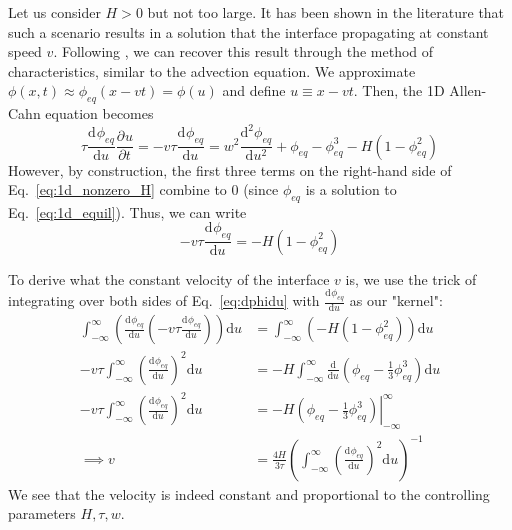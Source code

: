 \documentclass[12pt]{article}
\newcommand{\refeq}[1]{Eq.~\eqref{#1}}
\newcommand{\diff}{\mathrm{d}}
\providecommand*{\deriv}[3][]{\frac{\diff^{#1}#2}{\diff #3^{#1}}}
\providecommand*{\pderiv}[3][]{\frac{\partial^{#1}#2}{\partial #3^{#1}}}
\begin{document}
Let us consider $H>0$ but not too large. 
It has been shown in the literature that such a scenario results in a solution that the interface propagating at constant speed $v$.
Following \cite{provatas2011phase}, we can recover this result through the method of characteristics, similar to the advection equation.
We approximate $\phi(x,t) \approx \phi_{eq}(x-vt) = \phi(u)$ and define $u\equiv x-vt$.
Then, the 1D Allen-Cahn equation becomes
\begin{equation}
    \tau \deriv{\phi_{eq}}{u} \pderiv{u}{t} = -v \tau \deriv{\phi_{eq}}{u} = w^2 \deriv[2]{\phi_{eq}}{u} + \phi_{eq} - \phi_{eq}^3 -H\left(1 - \phi_{eq}^2\right) \label{eq:1d_nonzero_H}
\end{equation}
However, by construction, the first three terms on the right-hand side of \refeq{eq:1d_nonzero_H} combine to 0 (since $\phi_{eq}$ is a solution to \refeq{eq:1d_equil}).
Thus, we can write
\begin{equation}
    -v\tau \deriv{\phi_{eq}}{u} = -H\left(1-\phi_{eq}^2\right)
    \label{eq:dphidu}
\end{equation}

To derive what the constant velocity of the interface $v$ is, we use the trick of integrating over both sides of \refeq{eq:dphidu} with $\deriv{\phi_{eq}}{u}$ as our "kernel":
\begin{align}
    \int_{-\infty}^{\infty} \left(\deriv{\phi_{eq}}{u} \left(-v \tau \deriv{\phi_{eq}}{u}\right)\right)\diff u &= \int_{-\infty}^{\infty} \left(-H (1-\phi_{eq}^2)\right)\diff u \nonumber \\
    -v \tau \int_{-\infty}^{\infty}\left(\deriv{\phi_{eq}}{u}\right)^2 \diff u &= -H \int_{-\infty}^{\infty} \frac{\diff}{\diff u} \left(\phi_{eq} - \frac{1}{3}\phi_{eq}^3\right)\diff u \nonumber \\
    -v \tau \int_{-\infty}^{\infty}\left(\deriv{\phi_{eq}}{u}\right)^2 \diff u &= -H \left.\left(\phi_{eq} - \frac{1}{3}\phi_{eq}^3\right)\right|_{-\infty}^{\infty} \nonumber \\
    \implies v &= \frac{4H}{3\tau}\left(\int_{-\infty}^{\infty}\left(\deriv{\phi_{eq}}{u}\right)^2 \diff u\right)^{-1} \label{eq:1d_vel}
\end{align}
We see that the velocity is indeed constant and proportional to the controlling parameters $H, \tau, w$.
\end{document}
